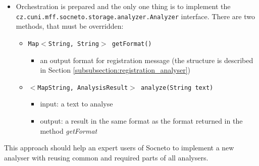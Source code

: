 \begin{itemize}
  \item Orchestration is prepared and the only one thing is to implement the \texttt{cz.cuni.mff.socneto.storage.analyzer.Analyzer} interface. There are two methods, that must be overridden:
  \begin{itemize}
	    \item \texttt{Map$<$String, String$>$ getFormat()}
	    \begin{itemize}
	        \item an output format for registration message (the structure is described in Section \ref{subsubsection:registration_analyser})
        \end{itemize}
	    \item \texttt{$<$MapString, AnalysisResult$>$ analyze(String text)}
	    \begin{itemize}
	        \item input: a text to analyse
	        \item output: a result in the same format as the format returned in the method \textit{getFormat}
        \end{itemize}
   \end{itemize}
\end{itemize}

This approach should help an expert users of Socneto to implement a new analyser with reusing common and required parts of all analysers.

